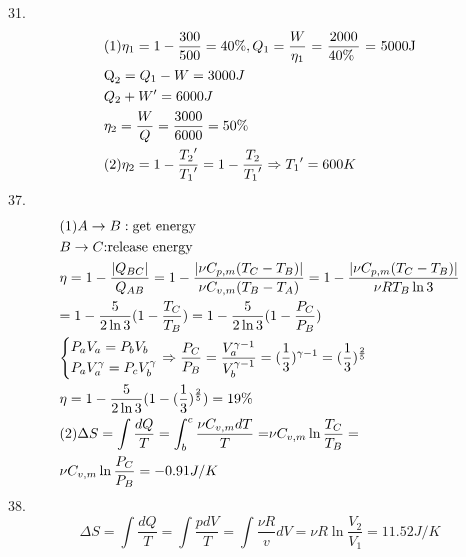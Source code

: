 \documentclass{article}
\begin{document}
31.\[\begin{gathered}
(1){\eta _1} = 1 - \frac{{300}}{{500}} = 40\% ,{Q_1} = \frac{W}{{{\eta _{\text{1}}}}}{\text{ = }}\frac{{{\text{2000}}}}{{{\text{40\% }}}}{\text{ = 5000J}} \hfill \\
{{\text{Q}}_2} = {Q_1} - W = 3000J \hfill \\
{Q_2} + W' = 6000J \hfill \\
{\eta _2} = \frac{W}{Q} = \frac{{3000}}{{6000}} = 50\%  \hfill \\
(2){\eta _2} = 1 - \frac{{{T_2}'}}{{{T_1}'}} = 1 - \frac{{{T_2}}}{{{T_1}'}} \Rightarrow {T_1}' = 600K \hfill \\ 
\end{gathered} \]
37.\[\begin{gathered}
(1)A \to B:{\text{get energy }} \hfill \\
B \to C{\text{:release energy}} \hfill \\
\eta  = 1 - \frac{{|{Q_{BC}}|}}{{{Q_{AB}}}} = 1 - \frac{{|\nu {C_{p,m}}({T_C} - {T_B})|}}{{\nu {C_{v,m}}({T_B} - {T_A})}} = 1 - \frac{{|\nu {C_{p,m}}({T_C} - {T_B})|}}{{\nu R{T_B}\ln 3}} \hfill \\
= 1 - \frac{5}{{2\ln 3}}(1 - \frac{{{T_C}}}{{{T_B}}}) = 1 - \frac{5}{{2\ln 3}}(1 - \frac{{{P_C}}}{{{P_B}}}) \hfill \\
\left\{ \begin{gathered}
{P_a}{V_a} = {P_b}{V_b} \hfill \\
{P_a}V_a^\gamma  = {P_c}V_b^\gamma  \hfill \\ 
\end{gathered}  \right. \Rightarrow \frac{{{P_C}}}{{{P_B}}} = \frac{{V_a^{\gamma  - 1}}}{{V_b^{\gamma  - 1}}} = {(\frac{1}{3})^{\gamma  - 1}} = {(\frac{1}{3})^{\frac{2}{5}}} \hfill \\
\eta  = 1 - \frac{5}{{2\ln 3}}(1 - {(\frac{1}{3})^{\frac{2}{5}}}) = 19\%  \hfill \\
(2)\Delta S = \int {\frac{{dQ}}{T} = \int_b^c {\frac{{\nu {C_{v,m}}dT}}{T} = } } \nu {C_{v,m}}\ln \frac{{{T_C}}}{{{T_B}}} =  \hfill \\
\nu {C_{v,m}}\ln \frac{{{P_C}}}{{{P_B}}} =  - 0.91J/K \hfill \\ 
\end{gathered} \]
38.\[\Delta S = \int {\frac{{dQ}}{T} = \int {\frac{{pdV}}{T} = \int {\frac{{\nu R}}{v}dV = \nu R\ln \frac{{{V_2}}}{{{V_1}}} = 11.52J/K} } } \]
\end{document}
